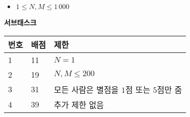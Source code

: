 \begin{itemize}
\item $1 \le N, M \le 1\,000$
\end{itemize}

\textbf{서브태스크}
\begin{tabular}{|l|l|l|} \hline
  \textbf{번호} & \textbf{배점} & \textbf{제한} \\ \hline
  1 & 11 & $N = 1$ \\ \hline
  2 & 19 & $N, M \le 200$ \\ \hline
  3 & 31 & 모든 사람은 별점을 $1$점 또는 $5$점만 줌 \\ \hline
  4 & 39 & 추가 제한 없음 \\ \hline
\end{tabular}
